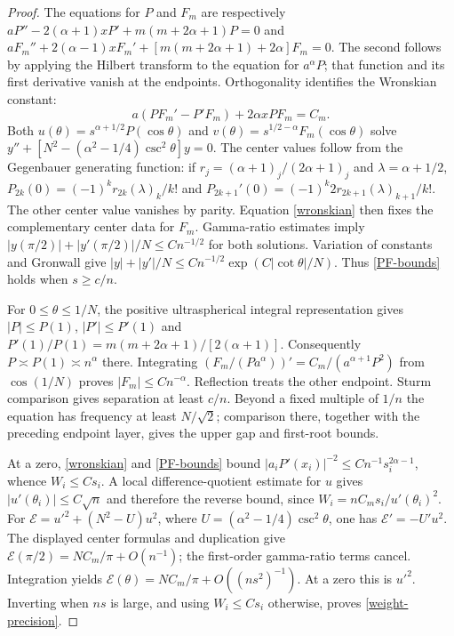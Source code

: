 \documentclass[a4paper,11pt]{amsart}
\theoremstyle{remark}\newtheorem{remark}[theorem]{Remark}
\begin{document}
\begin{proof}
The equations for $P$ and $F_m$ are respectively
$aP''-2(\alpha+1)xP'+m(m+2\alpha+1)P=0$ and
$aF_m''+2(\alpha-1)xF_m'+[m(m+2\alpha+1)+2\alpha]F_m=0$.
The second follows by applying the Hilbert transform to the equation
for $a^\alpha P$; that function and its first derivative vanish at the
endpoints. Orthogonality identifies the Wronskian constant:
\begin{equation}\label{wronskian}
 a(PF_m'-P'F_m)+2\alpha xPF_m=C_m.
\end{equation}
Both $u(\theta)=s^{\alpha+1/2}P(\cos\theta)$ and
$v(\theta)=s^{1/2-\alpha}F_m(\cos\theta)$ solve
$y''+[N^2-(\alpha^2-1/4)\csc^2\theta]y=0$.
The center values follow from the Gegenbauer generating function:
if $r_j=(\alpha+1)_j/(2\alpha+1)_j$ and $\lambda=\alpha+1/2$,
$P_{2k}(0)=(-1)^kr_{2k}(\lambda)_k/k!$ and
$P_{2k+1}'(0)=(-1)^k2r_{2k+1}(\lambda)_{k+1}/k!$.
The other center value vanishes by parity. Equation \eqref{wronskian}
then fixes the complementary center data for $F_m$.
Gamma-ratio estimates imply
$|y(\pi/2)|+|y'(\pi/2)|/N\le Cn^{-1/2}$ for both solutions.
Variation of constants and Gronwall give
$|y|+|y'|/N\le Cn^{-1/2}\exp(C|\cot\theta|/N)$.
Thus \eqref{PF-bounds} holds when $s\ge c/n$.

For $0\le\theta\le1/N$, the positive ultraspherical integral
representation gives $|P|\le P(1)$, $|P'|\le P'(1)$ and
$P'(1)/P(1)=m(m+2\alpha+1)/[2(\alpha+1)]$.
Consequently $P\asymp P(1)\asymp n^\alpha$ there. Integrating
$(F_m/(Pa^\alpha))'=C_m/(a^{\alpha+1}P^2)$ from $\cos(1/N)$
proves $|F_m|\le Cn^{-\alpha}$. Reflection treats the other endpoint.
Sturm comparison gives separation at least $c/n$. Beyond a fixed
multiple of $1/n$ the equation has frequency at least $N/\sqrt2$;
comparison there, together with the preceding endpoint layer,
gives the upper gap and first-root bounds.

At a zero, \eqref{wronskian} and \eqref{PF-bounds} bound
$|a_iP'(x_i)|^{-2}\le Cn^{-1}s_i^{2\alpha-1}$, whence
$W_i\le Cs_i$. A local difference-quotient estimate for $u$ gives
$|u'(\theta_i)|\le C\sqrt n$ and therefore the reverse bound,
since $W_i=nC_ms_i/u'(\theta_i)^2$.
For $\mathscr E=u'^2+(N^2-U)u^2$, where
$U=(\alpha^2-1/4)\csc^2\theta$, one has $\mathscr E'=-U'u^2$.
The displayed center formulas and duplication give
$\mathscr E(\pi/2)=NC_m/\pi+O(n^{-1})$; the first-order
gamma-ratio terms cancel. Integration yields
$\mathscr E(\theta)=NC_m/\pi+O((ns^2)^{-1})$.
At a zero this is $u'^2$. Inverting when $ns$ is large, and using
$W_i\le Cs_i$ otherwise, proves \eqref{weight-precision}.


\end{proof}
\end{document}
